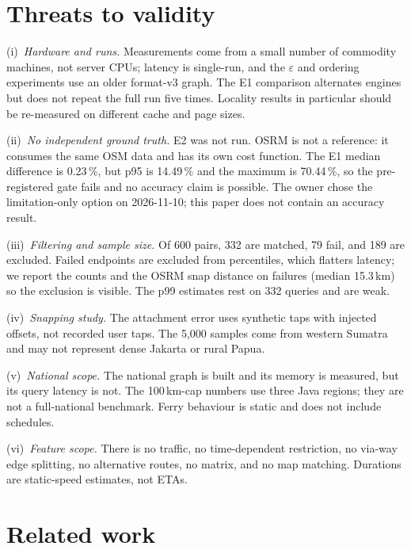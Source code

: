 \documentclass[sigconf,nonacm]{acmart}
\begin{document}
\section{Threats to validity}
\label{sec:threats}
(i)~\emph{Hardware and runs.} Measurements come from a small number of commodity
machines, not server CPUs; latency is single-run, and the $\varepsilon$ and
ordering experiments use an older format-v3 graph. The E1 comparison alternates
engines but does not repeat the full run five times. Locality results in
particular should be re-measured on different cache and page sizes.

(ii)~\emph{No independent ground truth.} E2 was not run. OSRM is not a reference:
it consumes the same OSM data and has its own cost function. The E1 median
difference is 0.23\,\%, but p95 is 14.49\,\% and the maximum is 70.44\,\%, so the
pre-registered gate fails and no accuracy claim is possible. The owner chose the
limitation-only option on 2026-11-10; this paper does not contain an accuracy
result.

(iii)~\emph{Filtering and sample size.} Of 600 pairs, 332 are matched, 79 fail,
and 189 are excluded. Failed endpoints are excluded from percentiles, which
flatters latency; we report the counts and the OSRM snap distance on failures
(median 15.3\,km) so the exclusion is visible. The p99 estimates rest on 332
queries and are weak.

(iv)~\emph{Snapping study.} The attachment error uses synthetic taps with
injected offsets, not recorded user taps. The 5{,}000 samples come from western
Sumatra and may not represent dense Jakarta or rural Papua.

(v)~\emph{National scope.} The national graph is built and its memory is measured,
but its query latency is not. The 100\,km-cap numbers use three Java regions;
they are not a full-national benchmark. Ferry behaviour is static and does not
include schedules.

(vi)~\emph{Feature scope.} There is no traffic, no time-dependent restriction, no
via-way edge splitting, no alternative routes, no matrix, and no map matching.
Durations are static-speed estimates, not ETAs.

\section{Related work}
\end{document}

